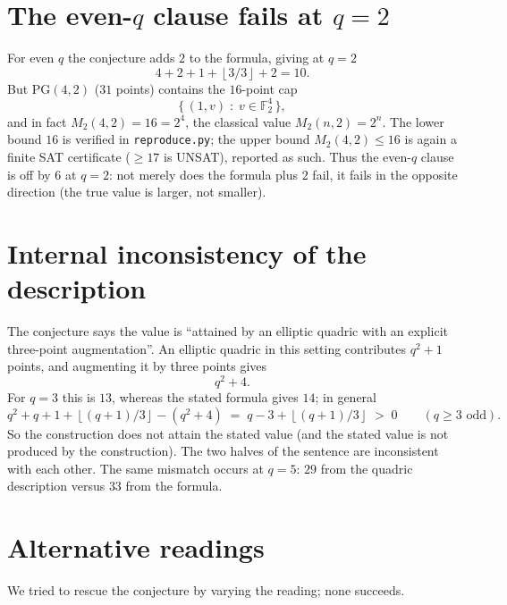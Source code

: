 \documentclass[11pt]{article}
\theoremstyle{definition}
\theoremstyle{remark}
\newcommand{\F}{\mathbb{F}}
\newcommand{\PG}{\mathrm{PG}}
\newcommand{\floor}[1]{\left\lfloor #1 \right\rfloor}
\begin{document}
\section{The even-$q$ clause fails at $q=2$}

For even $q$ the conjecture adds $2$ to the formula, giving at $q=2$
\[
4+2+1+\floor{3/3}+2 = 10 .
\]
But $\PG(4,2)$ ($31$ points) contains the $16$-point cap
\[
\{\,(1,v)\;:\;v\in\F_{2}^{4}\,\},
\]
and in fact $M_{2}(4,2)=16=2^{4}$, the classical value $M_{2}(n,2)=2^{n}$. The
lower bound $16$ is verified in \texttt{reproduce.py}; the upper bound
$M_{2}(4,2)\le 16$ is again a finite SAT certificate ($\ge 17$ is UNSAT),
reported as such. Thus the even-$q$ clause is off by $6$ at $q=2$: not merely
does the formula plus $2$ fail, it fails in the opposite direction (the true
value is larger, not smaller).

\section{Internal inconsistency of the description}

The conjecture says the value is ``attained by an elliptic quadric with an
explicit three-point augmentation''. An elliptic quadric in this setting
contributes $q^{2}+1$ points, and augmenting it by three points gives
\[
q^{2}+4 .
\]
For $q=3$ this is $13$, whereas the stated formula gives $14$; in general
\[
q^{2}+q+1+\floor{(q+1)/3} - (q^{2}+4)
   \;=\; q-3+\floor{(q+1)/3} \;>\; 0 \qquad (q\ge 3 \text{ odd}).
\]
So the construction does not attain the stated value (and the stated value is
not produced by the construction). The two halves of the sentence are
inconsistent with each other. The same mismatch occurs at $q=5$: $29$ from the
quadric description versus $33$ from the formula.

\section{Alternative readings}
\label{sec:readings}

We tried to rescue the conjecture by varying the reading; none succeeds.
\end{document}
